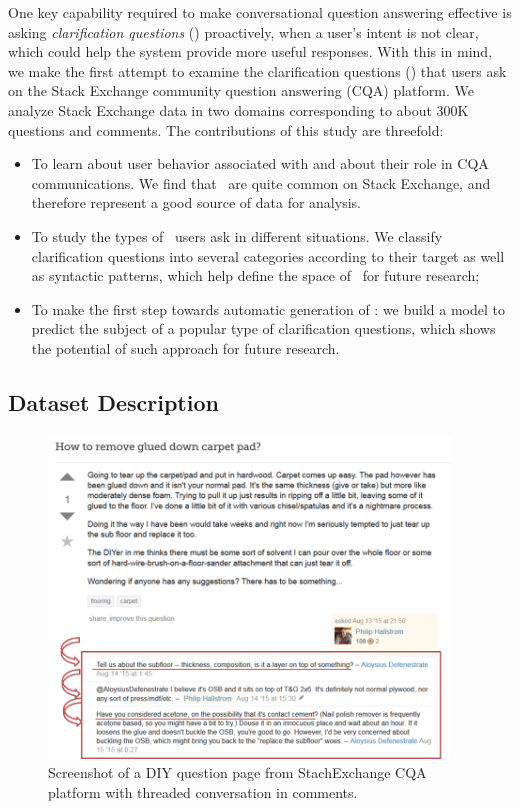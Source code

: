 One key capability required to make conversational question answering effective is asking \textit{clarification questions} (\clarQ) proactively, when a user's intent is not clear, which could help the system provide more useful responses.
With this in mind, we make the first attempt to examine the clarification questions (\clarQ) that users ask on the Stack Exchange community question answering (CQA) platform.
We analyze Stack Exchange data in two domains
corresponding to about 300K questions and comments.
The contributions of this study are threefold:
\begin{itemize}[noitemsep]
\item To learn about user behavior associated with \clarQ and about their role in CQA communications. We find that \clarQ~are quite common on Stack Exchange, and therefore represent a good source of data for analysis.
\item To study the types of \clarQ~users ask in different situations. We classify clarification questions into several categories according to their target as well as syntactic patterns, which help define the space of \clarQ~for future research;
\item To make the first step towards automatic generation of \clarQ: 
we build a model to predict the subject of a popular type of clarification questions, which shows the potential of such approach for future research.
\end{itemize}

\subsection{Dataset Description}
\label{section:conversation:clarq:data}

\begin{figure}[t]
\centering
\includegraphics[width=0.95\textwidth]{img/diy}
\caption{Screenshot of a DIY question page from StachExchange CQA platform with threaded conversation in comments.}
\label{figure:conversation:clarq:diy}
\end{figure}

